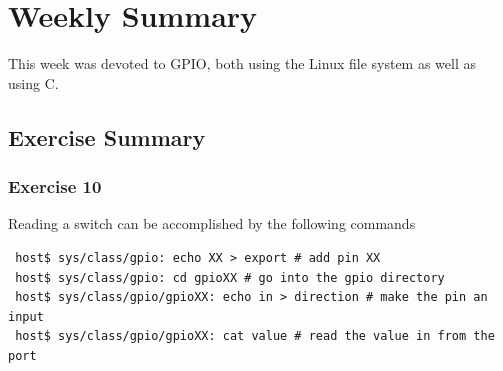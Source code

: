\documentclass[letterpaper,10pt]{texMemo}
\begin{document}
\maketitle

\section{Weekly Summary}

\noindent This week was devoted to GPIO, both using the Linux file system as
well as using C. 

\newpage
\subsection{Exercise Summary}

\subsubsection{Exercise 10}

\noindent Reading a switch can be accomplished by the following commands
\begin{verbatim}
 host$ sys/class/gpio: echo XX > export # add pin XX
 host$ sys/class/gpio: cd gpioXX # go into the gpio directory
 host$ sys/class/gpio/gpioXX: echo in > direction # make the pin an input
 host$ sys/class/gpio/gpioXX: cat value # read the value in from the port
\end{verbatim}
\end{document}
